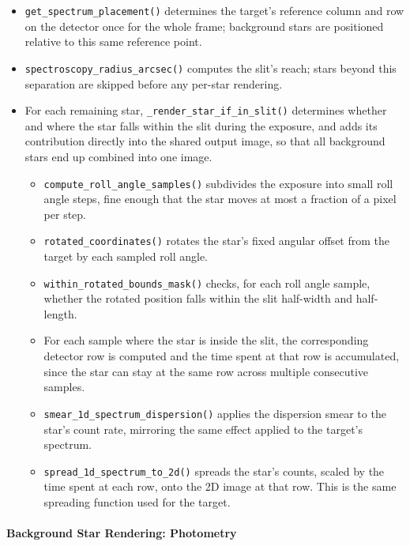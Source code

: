 \begin{itemize}
    \item \texttt{get\_spectrum\_placement()} determines the target's reference column and row on the detector once for the whole frame; background stars are positioned relative to this same reference point.

    \item \texttt{spectroscopy\_radius\_arcsec()} computes the slit's reach; stars beyond this separation are skipped before any per-star rendering.

    \item For each remaining star, \texttt{\_render\_star\_if\_in\_slit()} determines whether and where the star falls within the slit during the exposure, and adds its contribution directly into the shared output image, so that all background stars end up combined into one image.
          \begin{itemize}
              \item \texttt{compute\_roll\_angle\_samples()} subdivides the exposure into small roll angle steps, fine enough that the star moves at most a fraction of a pixel per step.
              \item \texttt{rotated\_coordinates()} rotates the star's fixed angular offset from the target by each sampled roll angle.
              \item \texttt{within\_rotated\_bounds\_mask()} checks, for each roll angle sample, whether the rotated position falls within the slit half-width and half-length.
              \item For each sample where the star is inside the slit, the corresponding detector row is computed and the time spent at that row is accumulated, since the star can stay at the same row across multiple consecutive samples.
              \item \texttt{smear\_1d\_spectrum\_dispersion()} applies the dispersion smear to the star's count rate, mirroring the same effect applied to the target's spectrum.
              \item \texttt{spread\_1d\_spectrum\_to\_2d()} spreads the star's counts, scaled by the time spent at each row, onto the 2D image at that row. This is the same spreading function used for the target.
          \end{itemize}
\end{itemize}

\paragraph{Background Star Rendering: Photometry}

